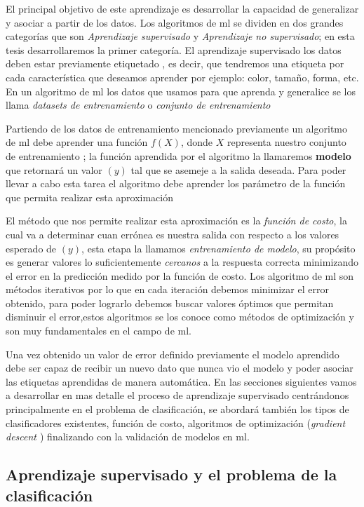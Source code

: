 El principal objetivo de este aprendizaje es desarrollar la capacidad de generalizar y asociar a partir de los datos. Los algoritmos de  \ac{ml} se dividen en dos grandes categorías que son \textit{Aprendizaje supervisado} y \textit{Aprendizaje no supervisado};  en esta tesis desarrollaremos la primer categoría.  El aprendizaje supervisado los datos deben estar previamente etiquetado , es decir, que tendremos una etiqueta por cada característica que deseamos aprender por ejemplo: color, tamaño, forma, etc. En un algoritmo de \ac{ml} los datos que usamos para que aprenda y generalice se los llama \textit{datasets de entrenamiento} o \textit{conjunto de entrenamiento}

Partiendo de los datos de entrenamiento mencionado previamente un algoritmo de \ac{ml} debe aprender una función  $ f(X)$, donde $ X$ representa nuestro conjunto de entrenamiento ; la función aprendida por el algoritmo la llamaremos \textbf{modelo}  que retornará un valor $(y)$ tal que se asemeje a la salida deseada. Para poder llevar a cabo esta tarea el algoritmo debe aprender los parámetro de la función que permita realizar esta aproximación 

El método que nos permite realizar esta aproximación es la \textit{función de costo}, la cual va a  determinar cuan errónea es nuestra salida con respecto a los valores esperado de  $(y)$, esta etapa la llamamos \textit{entrenamiento de modelo}, su propósito es generar valores lo suficientemente \textit{cercanos} a la respuesta correcta minimizando el error en la predicción medido por la función de costo. Los algoritmo de \ac{ml} son métodos iterativos por lo que en cada iteración debemos minimizar el error obtenido, para poder lograrlo debemos buscar valores óptimos que permitan disminuir el error,estos algoritmos se los conoce como métodos de optimización y son muy fundamentales en el campo de \ac{ml}.

  Una vez obtenido un valor de error definido previamente el modelo aprendido debe ser capaz de recibir un nuevo dato que nunca vio el modelo y poder asociar las etiquetas aprendidas de manera automática. En las secciones siguientes vamos a desarrollar en mas detalle el proceso de aprendizaje supervisado centrándonos principalmente en el problema de clasificación, se abordará también los tipos de clasificadores existentes, función de costo, algoritmos de optimización (\textit{gradient descent \citep{cnns}}) finalizando con la validación de modelos en \ac{ml}.

\subsection{Aprendizaje supervisado y el problema de la clasificación}\label{sub:aprendizaje_supervisado}

